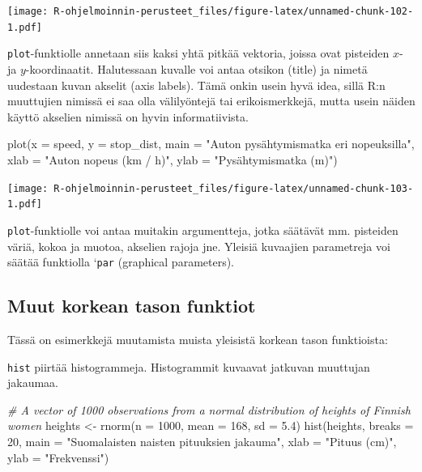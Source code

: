 \documentclass[
]{book}
\newenvironment{Shaded}{\begin{snugshade}}{\end{snugshade}}
\newcommand{\AttributeTok}[1]{\textcolor[rgb]{0.77,0.63,0.00}{#1}}
\newcommand{\CommentTok}[1]{\textcolor[rgb]{0.56,0.35,0.01}{\textit{#1}}}
\newcommand{\DecValTok}[1]{\textcolor[rgb]{0.00,0.00,0.81}{#1}}
\newcommand{\FloatTok}[1]{\textcolor[rgb]{0.00,0.00,0.81}{#1}}
\newcommand{\FunctionTok}[1]{\textcolor[rgb]{0.00,0.00,0.00}{#1}}
\newcommand{\NormalTok}[1]{#1}
\newcommand{\OtherTok}[1]{\textcolor[rgb]{0.56,0.35,0.01}{#1}}
\newcommand{\StringTok}[1]{\textcolor[rgb]{0.31,0.60,0.02}{#1}}
\begin{document}
\texttt{[image: R-ohjelmoinnin-perusteet\_files/figure-latex/unnamed-chunk-102-1.pdf]}

\texttt{plot}-funktiolle annetaan siis kaksi yhtä pitkää vektoria, joissa ovat pisteiden \(x\)- ja \(y\)-koordinaatit. Halutessaan kuvalle voi antaa otsikon (title) ja nimetä uudestaan kuvan akselit (axis labels). Tämä onkin usein hyvä idea, sillä R:n muuttujien nimissä ei saa olla välilyöntejä tai erikoismerkkejä, mutta usein näiden käyttö akselien nimissä on hyvin informatiivista.

\begin{Shaded}
\begin{Highlighting}[]
\FunctionTok{plot}\NormalTok{(}\AttributeTok{x =}\NormalTok{ speed, }\AttributeTok{y =}\NormalTok{ stop\_dist,}
     \AttributeTok{main =} \StringTok{"Auton pysähtymismatka eri nopeuksilla"}\NormalTok{,}
     \AttributeTok{xlab =} \StringTok{"Auton nopeus (km / h)"}\NormalTok{, }\AttributeTok{ylab =} \StringTok{"Pysähtymismatka (m)"}\NormalTok{)}
\end{Highlighting}
\end{Shaded}

\texttt{[image: R-ohjelmoinnin-perusteet\_files/figure-latex/unnamed-chunk-103-1.pdf]}

\texttt{plot}-funktiolle voi antaa muitakin argumentteja, jotka säätävät mm. pisteiden väriä, kokoa ja muotoa, akselien rajoja jne. Yleisiä kuvaajien parametreja voi säätää funktiolla `\texttt{par} (graphical parameters).

\hypertarget{muut-korkean-tason-funktiot}{%
\subsection{Muut korkean tason funktiot}\label{muut-korkean-tason-funktiot}}

Tässä on esimerkkejä muutamista muista yleisistä korkean tason funktioista:

\texttt{hist} piirtää histogrammeja. Histogrammit kuvaavat jatkuvan muuttujan jakaumaa.

\begin{Shaded}
\begin{Highlighting}[]
\CommentTok{\# A vector of 1000 observations from a normal distribution of heights of Finnish women}
\NormalTok{heights }\OtherTok{\textless{}{-}} \FunctionTok{rnorm}\NormalTok{(}\AttributeTok{n =} \DecValTok{1000}\NormalTok{, }\AttributeTok{mean =} \DecValTok{168}\NormalTok{, }\AttributeTok{sd =} \FloatTok{5.4}\NormalTok{)}
\FunctionTok{hist}\NormalTok{(heights, }\AttributeTok{breaks =} \DecValTok{20}\NormalTok{, }
     \AttributeTok{main =} \StringTok{"Suomalaisten naisten pituuksien jakauma"}\NormalTok{,}
     \AttributeTok{xlab =} \StringTok{"Pituus (cm)"}\NormalTok{, }\AttributeTok{ylab =} \StringTok{"Frekvenssi"}\NormalTok{)}
\end{Highlighting}
\end{Shaded}
\end{document}
